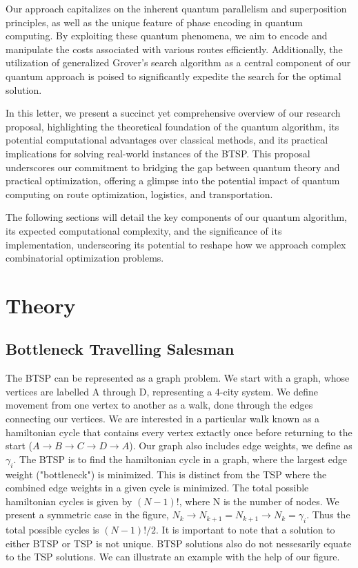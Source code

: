 \documentclass[twocolumn,showpacs,preprintnumbers,amsmath,amssymb]{revtex4}
\begin{document}
		Our approach capitalizes on the inherent quantum parallelism and superposition principles, as well as the unique feature of phase encoding in quantum computing. By exploiting these quantum phenomena, we aim to encode and manipulate the costs associated with various routes efficiently. Additionally, the utilization of generalized Grover's search algorithm as a central component of our quantum approach is poised to significantly expedite the search for the optimal solution.
		
		In this letter, we present a succinct yet comprehensive overview of our research proposal, highlighting the theoretical foundation of the quantum algorithm, its potential computational advantages over classical methods, and its practical implications for solving real-world instances of the BTSP. This proposal underscores our commitment to bridging the gap between quantum theory and practical optimization, offering a glimpse into the potential impact of quantum computing on route optimization, logistics, and transportation.
		
		The following sections will detail the key components of our quantum algorithm, its expected computational complexity, and the significance of its implementation, underscoring its potential to reshape how we approach complex combinatorial optimization problems.
		
		
		\section{Theory}
		
		\subsection{Bottleneck Travelling Salesman}
		The BTSP can be represented as a graph problem.  We start with a graph, whose vertices are labelled A through D, representing a 4-city system. We define movement from one vertex to another as a walk, done through the edges connecting our vertices. We are interested in a particular walk known as a hamiltonian cycle that contains every vertex extactly once before returning to the start ($A \rightarrow B \rightarrow C\rightarrow D \rightarrow A$). Our graph also includes edge weights, we define as $ \gamma_i $.
		The BTSP is to find the hamiltonian cycle in a graph, where the largest edge weight ("bottleneck") is minimized. This is distinct from the TSP where the combined edge weights in a given cycle is minimized. The total possible hamiltonian cycles is given by $(N-1)!$, where N is the number of nodes. We present a symmetric case in the figure,  $N_k \rightarrow N_{k+1} = N_{k+1} \rightarrow N_{k} = \gamma_i$. Thus the total possible cycles is  $(N-1)!/2$.  It is important to note that a solution to either BTSP or TSP is not unique. BTSP solutions also do not nessesarily equate to the TSP solutions. We can illustrate an example with the help of our figure. 
		
\end{document}
